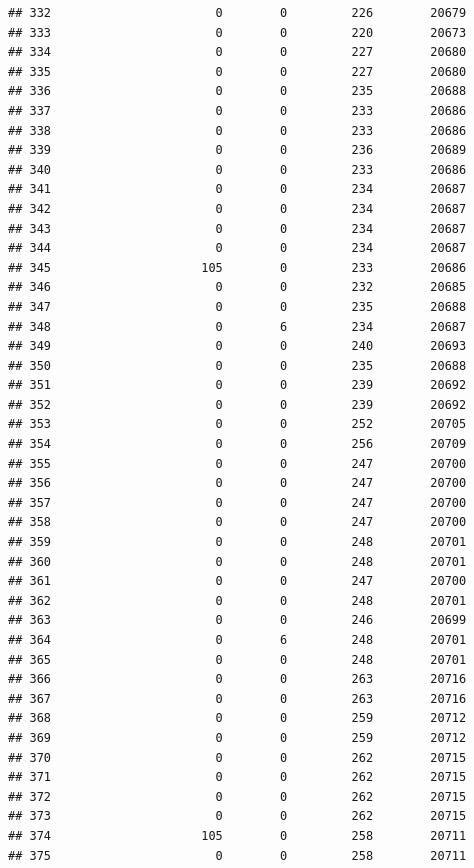 \documentclass[
]{article}
\begin{document}
\begin{verbatim}
## 332                       0        0         226        20679
## 333                       0        0         220        20673
## 334                       0        0         227        20680
## 335                       0        0         227        20680
## 336                       0        0         235        20688
## 337                       0        0         233        20686
## 338                       0        0         233        20686
## 339                       0        0         236        20689
## 340                       0        0         233        20686
## 341                       0        0         234        20687
## 342                       0        0         234        20687
## 343                       0        0         234        20687
## 344                       0        0         234        20687
## 345                     105        0         233        20686
## 346                       0        0         232        20685
## 347                       0        0         235        20688
## 348                       0        6         234        20687
## 349                       0        0         240        20693
## 350                       0        0         235        20688
## 351                       0        0         239        20692
## 352                       0        0         239        20692
## 353                       0        0         252        20705
## 354                       0        0         256        20709
## 355                       0        0         247        20700
## 356                       0        0         247        20700
## 357                       0        0         247        20700
## 358                       0        0         247        20700
## 359                       0        0         248        20701
## 360                       0        0         248        20701
## 361                       0        0         247        20700
## 362                       0        0         248        20701
## 363                       0        0         246        20699
## 364                       0        6         248        20701
## 365                       0        0         248        20701
## 366                       0        0         263        20716
## 367                       0        0         263        20716
## 368                       0        0         259        20712
## 369                       0        0         259        20712
## 370                       0        0         262        20715
## 371                       0        0         262        20715
## 372                       0        0         262        20715
## 373                       0        0         262        20715
## 374                     105        0         258        20711
## 375                       0        0         258        20711
\end{verbatim}
\end{document}
